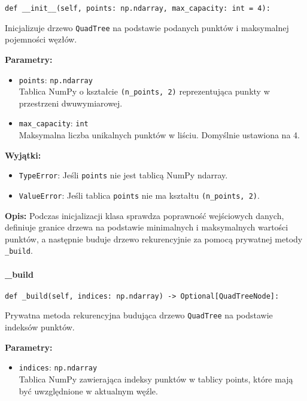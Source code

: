 \documentclass[12pt]{article}
\begin{document}
\begin{verbatim}
def __init__(self, points: np.ndarray, max_capacity: int = 4):
\end{verbatim}

\noindent Inicjalizuje drzewo \texttt{QuadTree} na podstawie podanych punktów i maksymalnej pojemności węzłów.

\noindent\textbf{Parametry:}
\begin{itemize}
    \item \texttt{points}: \texttt{np.ndarray} \\
    Tablica NumPy o kształcie \texttt{(n\_points, 2)} reprezentująca punkty w przestrzeni dwuwymiarowej.
    
    \item \texttt{max\_capacity}: \texttt{int} \\
    Maksymalna liczba unikalnych punktów w liściu. Domyślnie ustawiona na 4.
\end{itemize}

\noindent\textbf{Wyjątki:}
\begin{itemize}
    \item \texttt{TypeError}: Jeśli \texttt{points} nie jest tablicą NumPy ndarray.
    \item \texttt{ValueError}: Jeśli tablica \texttt{points} nie ma kształtu \texttt{(n\_points, 2)}.
\end{itemize}

\textbf{Opis:}
Podczas inicjalizacji klasa sprawdza poprawność wejściowych danych, definiuje granice drzewa na podstawie minimalnych i maksymalnych wartości punktów, a następnie buduje drzewo rekurencyjnie za pomocą prywatnej metody \texttt{\_build}.

\paragraph{\_build}

\begin{verbatim}
def _build(self, indices: np.ndarray) -> Optional[QuadTreeNode]:
\end{verbatim}

\noindent Prywatna metoda rekurencyjna budująca drzewo \texttt{QuadTree} na podstawie indeksów punktów.

\noindent\textbf{Parametry:}
\begin{itemize}
    \item \texttt{indices}: \texttt{np.ndarray} \\
    Tablica NumPy zawierająca indeksy punktów w tablicy points, które mają być uwzględnione w aktualnym węźle.
\end{itemize}
\end{document}
